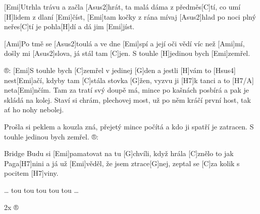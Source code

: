 
[Emi]Utrhla trávu a začla [Asus2]hrát,
ta malá dáma z předměs[C]tí,
co umí [H]lidem z dlaní [Emi]\null číst,
[Emi]tam kočky z rána mívaj [Asus2]hlad
po noci plný neřes[C]tí
je pohla[H]dí a dá jim [Emi]jíst.

[Ami]Po tmě se [Asus2]toulá a ve dne [Emi]spí
a její oči vědí víc než [Ami]mí,
došly mi [Asus2]slova, já stál tam [C]jen.
S touhle [H]jedinou bych [Emi]zemřel.

®: [Emi]S touhle bych [C]zemřel v jedinej [G]den
a jestli [H]vám to [Hsus4] nest[Emi]ačí,
kdyby tam [C]stála stovka [G]\null žen,
vyzvu ji [H7]k tanci a to [H7/A] neta[Emi]nčím.
\slpc
Tam za tratí svý doupě má,
mince po kašnách posbírá
a pak je skládá na kolej.
Staví si chrám, plechovej most,
už po něm kráčí první host,
tak ať ho nohy nebolej.

Prošla si peklem a kouzla zná,
přejetý mince počítá
a kdo ji spatří je zatracen.
S touhle jedinou bych zemřel.
®:

{Bridge}
Budu si [Emi]pamatovat na tu [G]chvíli,
když hrála [C]znělo to jak Paga[H7]nini
a já už [Emi]věděl, že jsem ztrace[G]nej,
zeptal se [C]za kolik s pocitem [H7]viny.

… tou tou tou tou tou …

2x ®


